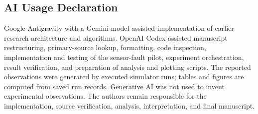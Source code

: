 \documentclass[runningheads]{llncs}
\begin{document}
\begin{samepage}
\section*{AI Usage Declaration}
Google Antigravity with a Gemini model assisted implementation of earlier research architecture and algorithms. OpenAI Codex assisted manuscript restructuring, primary-source lookup, formatting, code inspection, implementation and testing of the sensor-fault pilot, experiment orchestration, result verification, and preparation of analysis and plotting scripts. The reported observations were generated by executed simulator runs; tables and figures are computed from saved run records. Generative AI was not used to invent experimental observations. The authors remain responsible for the implementation, source verification, analysis, interpretation, and final manuscript.
\par\end{samepage}


\end{document}
